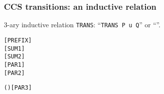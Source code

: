 \begin{frame}[fragile]
\frametitle{CCS transitions: an inductive relation}
3-ary inductive relation \texttt{TRANS}: ``\texttt{TRANS P u Q}'' or ``''.
\begin{small}
\begin{alltt}
\HOLTokenTurnstile{}  \HOLTokenTransBegin{}\HOLTokenTransEnd {}\hfill\texttt{[PREFIX]}
\HOLTokenTurnstile{}  \HOLTokenTransBegin{}\HOLTokenTransEnd {} \HOLSymConst{\HOLTokenImp{}}  \HOLSymConst{\ensuremath{+}}  \HOLTokenTransBegin{}\HOLTokenTransEnd {}\hfill\texttt{[SUM1]}
\HOLTokenTurnstile{}  \HOLTokenTransBegin{}\HOLTokenTransEnd {} \HOLSymConst{\HOLTokenImp{}}  \HOLSymConst{\ensuremath{+}}  \HOLTokenTransBegin{}\HOLTokenTransEnd {}\hfill\texttt{[SUM2]}
\HOLTokenTurnstile{}  \HOLTokenTransBegin{}\HOLTokenTransEnd {} \HOLSymConst{\HOLTokenImp{}}  \HOLSymConst{\ensuremath{\parallel}}  \HOLTokenTransBegin{}\HOLTokenTransEnd {} \HOLSymConst{\ensuremath{\parallel}} \hfill\texttt{[PAR1]}
\HOLTokenTurnstile{}  \HOLTokenTransBegin{}\HOLTokenTransEnd {} \HOLSymConst{\HOLTokenImp{}}  \HOLSymConst{\ensuremath{\parallel}}  \HOLTokenTransBegin{}\HOLTokenTransEnd {} \HOLSymConst{\ensuremath{\parallel}} \hfill\texttt{[PAR2]}
\end{alltt}
\end{small}
\begin{scriptsize}
\begin{alltt}
\HOLTokenTurnstile{}  \HOLTokenTransBegin{} \HOLTokenTransEnd {} \HOLSymConst{\HOLTokenConj{}}  \HOLTokenTransBegin{} ( )\HOLTokenTransEnd {} \HOLSymConst{\HOLTokenImp{}}  \HOLSymConst{\ensuremath{\parallel}}  \HOLTokenTransBegin\HOLSymConst{\ensuremath{\tau}}\HOLTokenTransEnd {} \HOLSymConst{\ensuremath{\parallel}} \hfill\texttt{[PAR3]}


\end{alltt}
\end{scriptsize}
\end{frame}
